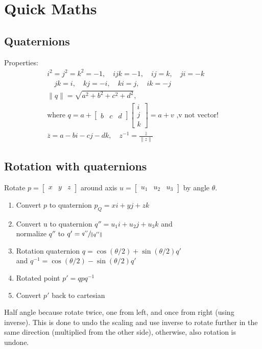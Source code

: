 \section{Quick Maths}

\subsection{Quaternions}

Properties:
\begin{align*}
  i^2=j^2=k^2 = -1, \quad ijk = -1, \quad ij=k, \quad ji=-k \\ \quad jk=i, \quad kj = -i, \quad ki = j, \quad ik = -j \\
  \lVert q \rVert = \sqrt{a^2+b^2+c^2+d^2},\\ \text{where } q = a + \left[\begin{smallmatrix} b & c & d \end{smallmatrix}\right] \left[\begin{smallmatrix} i \\ j \\ k \end{smallmatrix}\right] = a + v \text{ ,v not vector!} \\
  \overline{z} = a - bi - cj - dk, \quad z^{-1} = \frac{\overline{z}}{\lVert z \rVert}
\end{align*}

\subsection{Rotation with quaternions}

Rotate \( p = \left[\begin{smallmatrix} x & y & z \end{smallmatrix}\right] \) around axis \( u = \left[\begin{smallmatrix} u_{1} & u_{2} & u_{3} \end{smallmatrix}\right] \) by angle \( \theta  \).
\begin{enumerate}
  \item Convert \( p \) to quaternion \( p_Q = xi + yj + zk \)
  \item Convert u to quaternion \( q'' = u_{1}i+u_{2}j+u_{3}k \) and \\ normalize \( q'' \) to \( q' = \sfrac{q''}{\lVert q'' \rVert} \)
  \item Rotation quaternion \( q = \cos (\theta /2) + \sin (\theta /2) q' \) \\ and \( q^{-1} = \cos (\theta /2) - \sin (\theta /2) q' \)
  \item Rotated point \( p' = q p q^{-1} \)
  \item Convert \( p' \) back to cartesian
\end{enumerate}
Half angle because rotate twice, one from left, and once from right (using inverse). This is done to undo the scaling and use inverse to rotate further in the same direction (multiplied from the other side), otherwise, also rotation is undone.

